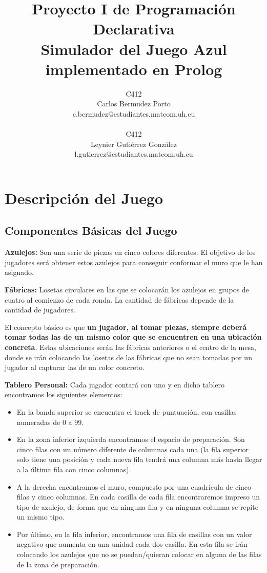 \documentclass[11pt]{article}
\title{Proyecto I de Programación Declarativa\\ \small{Simulador del Juego Azul implementado en Prolog}}
\author{C412\\Carlos Bermudez Porto\\c.bermudez@estudiantes.matcom.uh.cu\\\\C412\\Leynier Gutiérrez González\\l.gutierrez@estudiantes.matcom.uh.cu}
\begin{document}
\maketitle

\section{Descripción del Juego}

\subsection{Componentes Básicas del Juego}

\textbf{Azulejos:} Son una serie de piezas en cinco colores diferentes. El objetivo de los jugadores será obtener estos azulejos para conseguir conformar el muro que le han asignado.

\textbf{Fábricas:} Losetas circulares en las que se colocarán los azulejos en grupos de cuatro al comienzo de cada ronda. La cantidad de fábricas depende de la cantidad de jugadores.

El concepto básico es que \textbf{un jugador, al tomar piezas, siempre deberá tomar todas las de un mismo color que se encuentren en una ubicación concreta}. Estas ubicaciones serán las fábricas anteriores o el centro de la mesa, donde se irán colocando las losetas de las fábricas que no sean tomadas por un jugador al capturar las de un color concreto.

\textbf{Tablero Personal:} Cada jugador contará con uno y en dicho tablero encontramos los siguientes elementos:

\begin{itemize}
	\item En la banda superior se encuentra el track de puntuación, con casillas numeradas de 0 a 99.
	\item En la zona inferior izquierda encontramos el espacio de preparación. Son cinco filas con un número diferente de columnas cada una (la fila superior solo tiene una posición y cada nueva fila tendrá una columna más hasta llegar a la última fila con cinco columnas).
	\item A la derecha encontramos el muro, compuesto por una cuadrícula de cinco filas y cinco columnas. En cada casilla de cada fila encontraremos impreso un tipo de azulejo, de forma que en ninguna fila y en ninguna columna se repite un mismo tipo.
	\item Por último, en la fila inferior, encontramos una fila de casillas con un valor negativo que aumenta en una unidad cada dos casilla. En esta fila se irán colocando los azulejos que no se puedan/quieran colocar en alguna de las filas de la zona de preparación.
\end{itemize}
\end{document}
